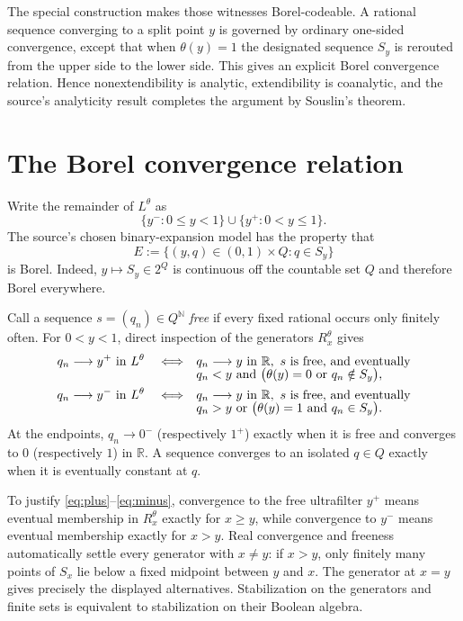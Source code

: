 \documentclass[11pt]{article}
\newcommand{\R}{\mathbb R}
\newcommand{\N}{\mathbb N}
\begin{document}
The special construction makes those witnesses Borel-codeable.  A rational sequence converging to a split point $y$ is governed by ordinary one-sided convergence, except that when $\theta(y)=1$ the designated sequence $S_y$ is rerouted from the upper side to the lower side.  This gives an explicit Borel convergence relation.  Hence nonextendibility is analytic, extendibility is coanalytic, and the source's analyticity result completes the argument by Souslin's theorem.

\section*{The Borel convergence relation}
Write the remainder of $L^\theta$ as
\[
 \{y^-:0\leq y<1\}\cup\{y^+:0<y\leq1\}.
\]
The source's chosen binary-expansion model has the property that
\begin{equation}\label{eq:E}
 E:=\{(y,q)\in(0,1)\times Q:q\in S_y\}
\end{equation}
is Borel.  Indeed, $y\mapsto S_y\in2^Q$ is continuous off the countable set $Q$ and therefore Borel everywhere.

Call a sequence $s=(q_n)\in Q^\N$ \emph{free} if every fixed rational occurs only finitely often.  For $0<y<1$, direct inspection of the generators $R_x^\theta$ gives
\begin{align}
 q_n\longrightarrow y^+\text{ in }L^\theta
 \quad\Longleftrightarrow\quad&
 q_n\longrightarrow y\text{ in }\R,\ s\text{ is free, and eventually} \notag\\[-2mm]
 &q_n<y\text{ and }\bigl(\theta(y)=0\text{ or }q_n\notin S_y\bigr),
 \label{eq:plus}\\
 q_n\longrightarrow y^-\text{ in }L^\theta
 \quad\Longleftrightarrow\quad&
 q_n\longrightarrow y\text{ in }\R,\ s\text{ is free, and eventually} \notag\\[-2mm]
 &q_n>y\text{ or }\bigl(\theta(y)=1\text{ and }q_n\in S_y\bigr).
 \label{eq:minus}
\end{align}
At the endpoints, $q_n\to0^-$ (respectively $1^+$) exactly when it is free and converges to $0$ (respectively $1$) in $\R$.  A sequence converges to an isolated $q\in Q$ exactly when it is eventually constant at $q$.

To justify \eqref{eq:plus}--\eqref{eq:minus}, convergence to the free ultrafilter $y^+$ means eventual membership in $R_x^\theta$ exactly for $x\geq y$, while convergence to $y^-$ means eventual membership exactly for $x>y$.  Real convergence and freeness automatically settle every generator with $x\neq y$: if $x>y$, only finitely many points of $S_x$ lie below a fixed midpoint between $y$ and $x$.  The generator at $x=y$ gives precisely the displayed alternatives.  Stabilization on the generators and finite sets is equivalent to stabilization on their Boolean algebra.
\end{document}
